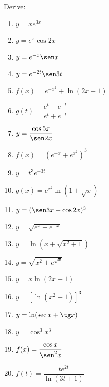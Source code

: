 \begin{exercicio}[4]
Derive:
\begin{enumerate}[label=\alph*)]
    \item $y = xe^{3x}$
    \item $y = e^x \cos 2x$
    \item $y = e^{-x}\sen x$
    \item $y = e^{-2t}\sen 3t$
    \item $f(x) = e^{-x^2} + \ln(2x + 1)$
    \item $g(t) = \dfrac{e^t - e^{-t}}{e^t + e^{-t}}$
    \item $y = \dfrac{\cos 5x}{\sen 2x}$
    \item $f(x) = (e^{-x} + e^{x^2})^3$
    \item $y = t^3 e^{-3t}$
    \item $g(x) = e^{x^2}\ln(1 + \sqrt{x})$
    \item $y = (\sen 3x + \cos 2x)^3$
    \item $y = \sqrt{e^x + e^{-x}}$
    \item $y = \ln(x + \sqrt{x^2 + 1})$
    \item $y = \sqrt{x^2 + e^{\sqrt{x}}}$
    \item $y = x\ln(2x + 1)$
    \item $y = [\ln(x^2 + 1)]^3$
    \item $y = \ln(\sec x + \tg x)$
    \item $y = \cos^3 x^3$
    \item $f(x) = \dfrac{\cos x}{\sen^2 x}$
    \item $f(t) = \dfrac{te^{2t}}{\ln(3t + 1)}$
\end{enumerate}
\end{exercicio}

